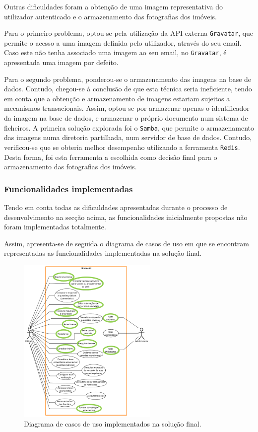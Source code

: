 Outras dificuldades foram a obtenção de uma imagem representativa do utilizador autenticado e o armazenamento das fotografias dos imóveis.

Para o primeiro problema, optou-se pela utilização da API externa \texttt{Gravatar}, que permite o acesso a uma imagem definida pelo utilizador, através do seu email. Caso este não tenha associado uma imagem ao seu email, no \texttt{Gravatar}, é apresentada uma imagem por defeito.

Para o segundo problema, ponderou-se o armazenamento das imagens na base de dados. Contudo, chegou-se à conclusão de que esta técnica seria ineficiente, tendo em conta que a obtenção e armazenamento de imagens estariam sujeitos a mecanismos transacionais. Assim, optou-se por armazenar apenas o identificador da imagem na base de dados, e armazenar o próprio documento num sistema de ficheiros. A primeira solução explorada foi o \texttt{Samba}, que permite o armazenamento das imagens numa diretoria partilhada, num servidor de base de dados. Contudo, verificou-se que se obteria melhor desempenho utilizando a ferramenta \texttt{Redis}. Desta forma, foi esta ferramenta a escolhida como decisão final para o armazenamento das fotografias dos imóveis. 

\subsubsection{Funcionalidades implementadas}

Tendo em conta todas as dificuldades apresentadas durante o processo de desenvolvimento na secção acima, as funcionalidades inicialmente propostas não foram implementadas totalmente.

Assim, apresenta-se de seguida o diagrama de casos de uso em que se encontram representadas as funcionalidades implementadas na solução final.


    \begin{figure}[!ht]
        \centering
        \includegraphics[width=0.6\textwidth]{images/Imagem1.png}
        \caption{Diagrama de casos de uso implementados na solução final.}
        \label{fig:diagrama_dominio}
    \end{figure}    


